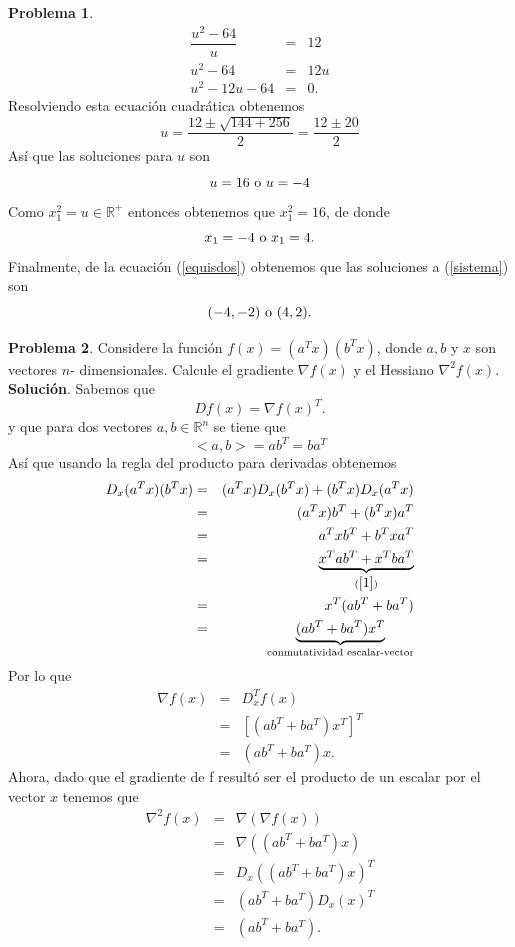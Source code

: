 \documentclass[12pt,letterpaper]{article}
\theoremstyle{definition}
\newtheorem{problm}{Problema}
\begin{document}
\begin{problm}
\begin{eqnarray*}
		\dfrac{u^2 - 64}{u} & = & 12 \\
		u^2 -64 & = & 12u	         \\
		u^2 - 12u -64 & = & 0.
	\end{eqnarray*}
	Resolviendo esta ecuación cuadrática obtenemos
	\[ u = \dfrac{12 \pm \sqrt{144 + 256}}{2} =  \dfrac{12 \pm 20}{2} \]
	Así que las soluciones para $ u $ son 
	\[ u = 16 \textup{ o } u = -4 \]
	Como $ x_1^2 = u \in\mathbb{R}^+ $ entonces obtenemos que $ x_1^2 = 16 $, de donde
	\[ x_1 = -4 \textup{ o } x_1 = 4. \]
	Finalmente, de la ecuación (\ref{equisdos}) obtenemos que las soluciones a (\ref{sistema}) son
	\[ (-4, -2) \textup{ o }  (4, 2). \]
\end{problm}

\begin{problm}
	Considere la función $ f(x) = (a^T x) (b^T x) $, donde $ a, b $ y $ x $ son vectores $ n $- dimensionales. Calcule el gradiente $ \nabla f(x) $ y el Hessiano $ \nabla^2 f(x) $.
	\\
	\textbf{Solución}. Sabemos que
	\[ D f(x) = \nabla f(x)^T . \]
	y que para dos vectores $ a, b \in\mathbb{R}^n$ se tiene que
	\begin{equation}\label{1}
		<a,b> = a b^T = b a^T
	\end{equation}
	Así que usando la regla del producto para derivadas obtenemos
	\begin{eqnarray*}
		D_x (a^T x) (b^T x) & = & (a^T x) D _x (b^T x) +  (b^T x) D_x (a^T x) \\
		 					& = & (a^T x) b^T +  (b^T x) a^T \\
						    & = & a^T x b^T + b^T x a^T \\
						    & = & \underbrace{x^T a b^T + x^T b a^T}_{(\ref{1})} \\
						    & = & x^T (ab^T + b a^T) \\
						    & = & \underbrace{(ab^T + b a^T) x^T}_{\textup{conmutatividad escalar-vector}}  \\
	\end{eqnarray*}
	Por lo que
	\begin{eqnarray*}
		\nabla f(x) & = & D_x ^T f(x) \\
					& = & \left[ (ab^T + b a^T) x^T \right]^T \\
					& = & (ab^T + b a^T) x.
	\end{eqnarray*}
	Ahora, dado que el gradiente de f resultó ser el producto de un escalar por el vector $ x $ tenemos que
	\begin{eqnarray*}
		\nabla^2 f(x) & = & \nabla (\nabla f(x)) \\
		   			  & = & \nabla ((ab^T + b a^T) x) \\
		   			  & = & D_x ((ab^T + b a^T) x)^T \\
		   			  & = & (ab^T + b a^T) D_x(x)^T \\
		   			  & = & (ab^T + b a^T).
	\end{eqnarray*}
\end{problm}
\end{document}
